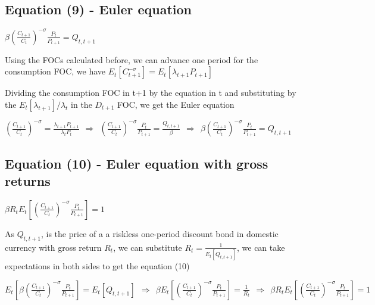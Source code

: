 \documentclass[
]{article}
\begin{document}
\vspace{12pt}

\hypertarget{equation-9---euler-equation}{%
\subsection{Equation (9) - Euler
equation}\label{equation-9---euler-equation}}

\(\displaystyle \beta \left( \frac{C_{t+1}}{C_t} \right)^{-\sigma} \frac{P_t}{P_{t+1}}= Q_{t,t+1}\)

\vspace{8pt}

Using the FOCs calculated before, we can advance one period for the
consumption FOC, we have
\(E_t [C_{t+1}^{-\sigma}] = E_t[\lambda_{t+1}P_{t+1}]\)

Dividing the consumption FOC in t+1 by the equation in t and
substituting by the \(E_t[\lambda_{t+1}]/\lambda_t\) in the \(D_{t+1}\)
FOC, we get the Euler equation

\(\displaystyle \left( \frac{C_{t+1}}{C_t} \right)^{-\sigma} = \frac{\lambda_{t+1} P_{t+1}}{\lambda_t P_t} \ \ \Rightarrow \ \  \left( \frac{C_{t+1}}{C_t} \right)^{-\sigma} \frac{P_t}{P_{t+1}}= \frac{Q_{t,t+1}}{\beta} \ \ \Rightarrow \ \  \beta \left( \frac{C_{t+1}}{C_t} \right)^{-\sigma} \frac{P_t}{P_{t+1}}= Q_{t,t+1}\)

\vspace{12pt}

\hypertarget{equation-10---euler-equation-with-gross-returns}{%
\subsection{Equation (10) - Euler equation with gross
returns}\label{equation-10---euler-equation-with-gross-returns}}

\(\beta R_t E_t \left[ \left( \frac{C_{t+1}}{C_t} \right)^{-\sigma} \frac{P_t}{P_{t+1}}\right]= 1\)

\vspace{8pt}

As \(Q_{t,t+1}\), is the price of a a riskless one-period discount bond
in domestic currency with gross return \(R_t\), we can substitute
\(\displaystyle R_t=\frac{1}{E_t[Q_{t,t+1}]}\), we can take expectations
in both sides to get the equation (10)

\(\displaystyle E_t \left[ \beta \left( \frac{C_{t+1}}{C_t} \right)^{-\sigma} \frac{P_t}{P_{t+1}}\right]= E_t[Q_{t,t+1}] \ \ \Rightarrow \ \  \beta E_t \left[ \left( \frac{C_{t+1}}{C_t} \right)^{-\sigma} \frac{P_t}{P_{t+1}}\right]= \frac{1}{R_t} \ \ \Rightarrow \ \  \beta R_t E_t \left[ \left( \frac{C_{t+1}}{C_t} \right)^{-\sigma} \frac{P_t}{P_{t+1}}\right]= 1\)
\end{document}
